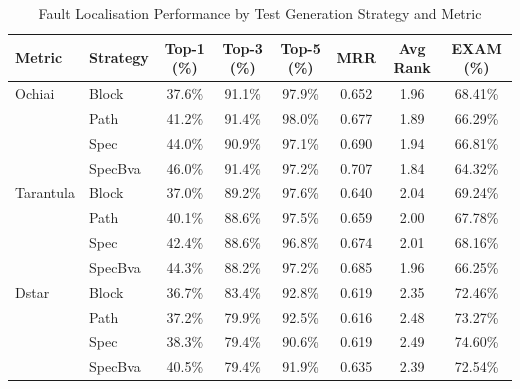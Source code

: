 \begin{table}[htbp]
\centering
\caption{Fault Localisation Performance by Test Generation Strategy and Metric}
\label{tab:all_metrics_results}
\begin{tabular}{l l c c c c c c}
\hline
\textbf{Metric} & \textbf{Strategy} & \textbf{Top-1 (\%)} & \textbf{Top-3 (\%)} & \textbf{Top-5 (\%)} & \textbf{MRR} & \textbf{Avg Rank} & \textbf{EXAM (\%)} \\
\hline
Ochiai & Block & 37.6\% & 91.1\% & 97.9\% & 0.652 & 1.96 & 68.41\% \\
 & Path & 41.2\% & 91.4\% & 98.0\% & 0.677 & 1.89 & 66.29\% \\
 & Spec & 44.0\% & 90.9\% & 97.1\% & 0.690 & 1.94 & 66.81\% \\
 & SpecBva & 46.0\% & 91.4\% & 97.2\% & 0.707 & 1.84 & 64.32\% \\
\hline
Tarantula & Block & 37.0\% & 89.2\% & 97.6\% & 0.640 & 2.04 & 69.24\% \\
 & Path & 40.1\% & 88.6\% & 97.5\% & 0.659 & 2.00 & 67.78\% \\
 & Spec & 42.4\% & 88.6\% & 96.8\% & 0.674 & 2.01 & 68.16\% \\
 & SpecBva & 44.3\% & 88.2\% & 97.2\% & 0.685 & 1.96 & 66.25\% \\
\hline
Dstar & Block & 36.7\% & 83.4\% & 92.8\% & 0.619 & 2.35 & 72.46\% \\
 & Path & 37.2\% & 79.9\% & 92.5\% & 0.616 & 2.48 & 73.27\% \\
 & Spec & 38.3\% & 79.4\% & 90.6\% & 0.619 & 2.49 & 74.60\% \\
 & SpecBva & 40.5\% & 79.4\% & 91.9\% & 0.635 & 2.39 & 72.54\% \\
\hline
\end{tabular}
\end{table}
